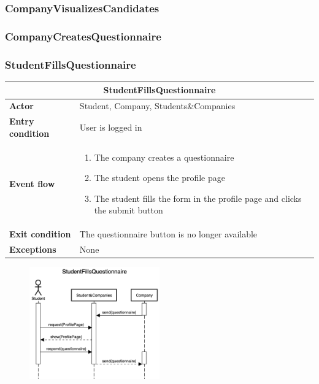 \subsubsection{CompanyVisualizesCandidates}

\subsubsection{CompanyCreatesQuestionnaire}

\subsubsection{StudentFillsQuestionnaire}
\begin{table}[H]
    \centering
    \begin{tabular}{|l|m{10cm}|}
        \hline \multicolumn{2}{|c|}{\textbf{StudentFillsQuestionnaire}} \\
        \hline \textbf{Actor} & Student, Company, Students\&Companies \\
        \hline \textbf{Entry condition} & User is logged in \\
        \hline \textbf{Event flow} &
        \begin{enumerate}
            \item The company creates a questionnaire
            \item The student opens the profile page
            \item The student fills the form in the profile page and clicks the submit button
        \end{enumerate}
        \\
        \hline \textbf{Exit condition} & The questionnaire button is no longer available \\
        \hline \textbf{Exceptions} & None \\
        \hline
    \end{tabular}
\end{table}

\begin{figure}[H]
    \centering
    \includegraphics[width=0.5\textwidth]{../../assets/sequence-diagrams/StudentFillsQuestionnaire.png}
\end{figure}

